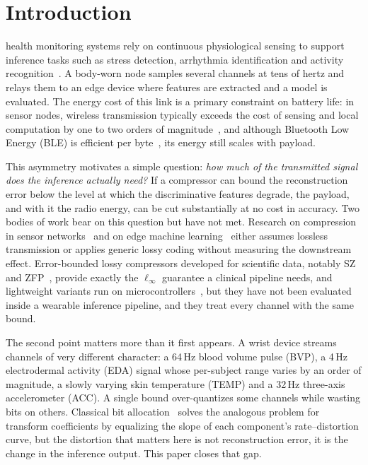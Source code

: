 \documentclass[journal,twoside,web]{ieeecolor}
\begin{document}
\maketitle

\section{Introduction}
 health monitoring systems rely on continuous physiological sensing to support inference tasks such as stress detection, arrhythmia identification and activity recognition~\cite{shi2016,zhou2019}. A body-worn node samples several channels at tens of hertz and relays them to an edge device where features are extracted and a model is evaluated. The energy cost of this link is a primary constraint on battery life: in sensor nodes, wireless transmission typically exceeds the cost of sensing and local computation by one to two orders of magnitude~\cite{anastasi2009}, and although Bluetooth Low Energy (BLE) is efficient per byte~\cite{siekkinen2012}, its energy still scales with payload.

This asymmetry motivates a simple question: \emph{how much of the transmitted signal does the inference actually need?} If a compressor can bound the reconstruction error below the level at which the discriminative features degrade, the payload, and with it the radio energy, can be cut substantially at no cost in accuracy. Two bodies of work bear on this question but have not met. Research on compression in sensor networks~\cite{razzaque2013,jalaleddine1990,ramakrishnan1997} and on edge machine learning~\cite{li2018,zhou2019} either assumes lossless transmission or applies generic lossy coding without measuring the downstream effect. Error-bounded lossy compressors developed for scientific data, notably SZ~\cite{di2016,tao2017,liang2018} and ZFP~\cite{lindstrom2014}, provide exactly the $\ell_\infty$ guarantee a clinical pipeline needs, and lightweight variants run on microcontrollers~\cite{azar2022}, but they have not been evaluated inside a wearable inference pipeline, and they treat every channel with the same bound.

The second point matters more than it first appears. A wrist device streams channels of very different character: a 64\,Hz blood volume pulse (BVP), a 4\,Hz electrodermal activity (EDA) signal whose per-subject range varies by an order of magnitude, a slowly varying skin temperature (TEMP) and a 32\,Hz three-axis accelerometer (ACC). A single bound over-quantizes some channels while wasting bits on others. Classical bit allocation~\cite{shoham1988,gersho1992} solves the analogous problem for transform coefficients by equalizing the slope of each component's rate--distortion curve, but the distortion that matters here is not reconstruction error, it is the change in the inference output. This paper closes that gap.
\end{document}

